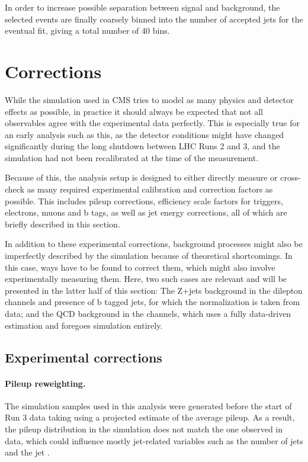 In order to increase possible separation between \ttbar signal and background, the selected events are finally coarsely binned into the number of accepted jets for the eventual fit, giving a total number of 40 bins.

\section{Corrections}
\label{sec:ttxs:corrections}

While the simulation used in CMS tries to model as many physics and detector effects as possible, in practice it should always be expected that not all observables agree with the experimental data perfectly. This is especially true for an early analysis such as this, as the detector conditions might have changed significantly during the long shutdown between LHC Runs 2 and 3, and the simulation had not been recalibrated at the time of the measurement. 

Because of this, the analysis setup is designed to either directly measure or cross-check as many required experimental calibration and correction factors as possible. This includes pileup corrections, efficiency scale factors for triggers, electrons, muons and b tags, as well as jet energy corrections, all of which are briefly described in this section.

In addition to these experimental corrections, background processes might also be imperfectly described by the simulation because of theoretical shortcomings. In this case, ways have to be found to correct them, which might also involve experimentally measuring them. Here, two such cases are relevant and will be presented in the latter half of this section: The Z+jets background in the dilepton channels and presence of b tagged jets, for which the normalization is taken from data; and the QCD background in the \ljets channels, which uses a fully data-driven estimation and foregoes simulation entirely.

\subsection{Experimental corrections}
\label{sec:ttxs:scalefactors}

\paragraph{Pileup reweighting.}

The simulation samples used in this analysis were generated before the start of Run 3 data taking using a projected estimate of the average pileup. As a result, the pileup distribution in the simulation does not match the one observed in data, which could influence mostly jet-related variables such as the number of jets and the jet \pt.


